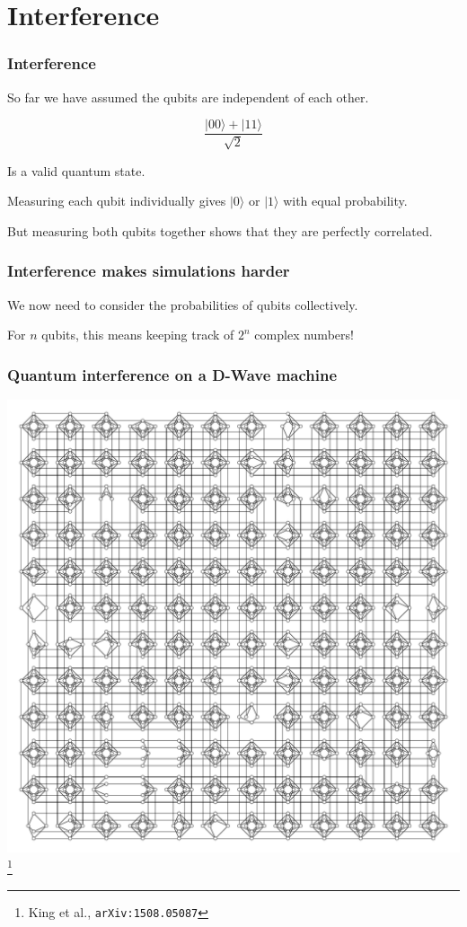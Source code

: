 \documentclass[]{beamer}
\begin{document}
\section{Interference}

\begin{frame}
\frametitle{Interference}

So far we have assumed the qubits are independent of each other.

$$\frac{|00\rangle + |11\rangle}{\sqrt{2}}$$

Is a valid quantum state.

Measuring each qubit individually gives $|0\rangle$ or $|1\rangle$ with equal probability.

But measuring both qubits together shows that they are perfectly correlated.

\end{frame}

\begin{frame}
\frametitle{Interference makes simulations harder}

We now need to consider the probabilities of qubits collectively.

For $n$ qubits, this means keeping track of $2^n$ complex numbers!
\end{frame}

\begin{frame}
\frametitle{Quantum interference on a D-Wave machine}
\begin{center}
\includegraphics[scale=0.25]{dwave2x}\footnote{King et al., {\tt arXiv:1508.05087}}
\end{center}
\end{frame}
\end{document}
